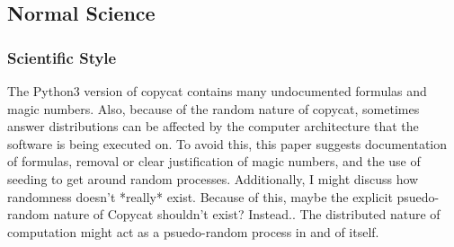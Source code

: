 \documentclass[a4paper]{article}
\begin{document}
    \subsection{Normal Science}
        \subsubsection{Scientific Style}
            The Python3 version of copycat contains many undocumented formulas and magic numbers.
            Also, because of the random nature of copycat, sometimes answer distributions can be affected by the computer architecture that the software is being executed on.
            To avoid this, this paper suggests documentation of formulas, removal or clear justification of magic numbers, and the use of seeding to get around random processes.
            Additionally, I might discuss how randomness doesn't *really* exist.
            Because of this, maybe the explicit psuedo-random nature of Copycat shouldn't exist?
            Instead.. The distributed nature of computation might act as a psuedo-random process in and of itself.
\end{document}

